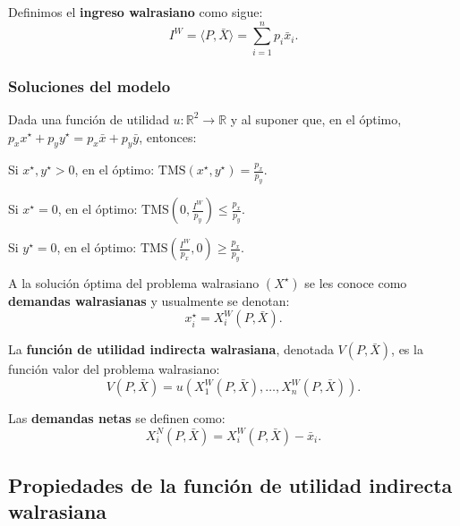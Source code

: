 \documentclass[8pt,a4paper]{extarticle}
\begin{document}
\begin{multicols}{3}
\begin{boxdef}
	Definimos el \textbf{ingreso walrasiano} como sigue:
	\[
		I^W = \langle P, \bar{X} \rangle = \sum_{i=1}^n p_i \bar{x}_i
	.\] 
\end{boxdef}

\subsubsection*{Soluciones del modelo}

Dada una función de utilidad $u : \mathbb{R}^2 \to \mathbb{R}$ y al suponer que, en el óptimo, $p_x x^\star + p_y y^\star = p_x \bar{x} + p_y \bar{y}$, entonces:

\begin{bulletlist}
\item Si $x^\star, y^\star > 0$, en el óptimo: $\displaystyle \text{TMS} (x^\star, y^\star) = \frac{p_x}{p_y}$.
\item Si $x^\star = 0$, en el óptimo: $\displaystyle \text{TMS} \left(0, \frac{I^W}{p_y}\right) \le \frac{p_x}{p_y}$.
\item Si $y^\star = 0$, en el óptimo: $\displaystyle \text{TMS} \left(\frac{I^W}{p_x}, 0\right) \ge \frac{p_x}{p_y}$.
\end{bulletlist}

\begin{boxdef}
A la solución óptima del problema walrasiano $(X^\star)$ se les conoce como \textbf{demandas walrasianas} y usualmente se denotan:
\[
	x_i^\star = X_i^W (P, \bar{X})
.\] 
\end{boxdef}

\begin{boxdef}
	La \textbf{función de utilidad indirecta walrasiana}, denotada $V(P, \bar{X})$, es la función valor del problema walrasiano:
	\[
		V(P, \bar{X}) = u(X_1^W(P, \bar{X}), \ldots, X_n^W(P, \bar{X}))
	.\] 
\end{boxdef}

\begin{boxdef}
	Las \textbf{demandas netas} se definen como:
	\[
		X_i^N (P, \bar{X}) = X_i^W (P, \bar{X}) - \bar{x}_i
	.\] 
\end{boxdef}

\subsection{Propiedades de la función de utilidad indirecta walrasiana}


\end{multicols}
\end{document}
